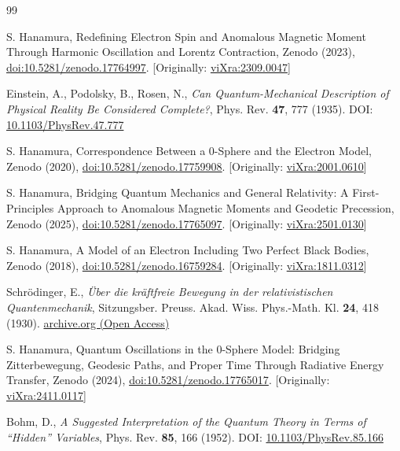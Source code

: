 \documentclass[12pt,letterpaper]{article} %
\begin{document}
\begin{thebibliography}{99}

S. Hanamura, Redefining Electron Spin and Anomalous Magnetic Moment Through Harmonic Oscillation and Lorentz Contraction, Zenodo (2023), \href{https://doi.org/10.5281/zenodo.17764997}{doi:10.5281/zenodo.17764997}. [Originally: \href{https://vixra.org/abs/2309.0047}{viXra:2309.0047}]

Einstein, A., Podolsky, B., Rosen, N., 
\textit{Can Quantum-Mechanical Description of Physical Reality Be Considered Complete?}, 
Phys. Rev. \textbf{47}, 777 (1935). 
DOI: \href{https://doi.org/10.1103/PhysRev.47.777}{10.1103/PhysRev.47.777}

S. Hanamura, Correspondence Between a 0-Sphere and the Electron Model, Zenodo (2020), \href{https://doi.org/10.5281/zenodo.17759908}{doi:10.5281/zenodo.17759908}. [Originally: \href{https://vixra.org/abs/2001.0610}{viXra:2001.0610}]

S. Hanamura, Bridging Quantum Mechanics and General Relativity: A First-Principles Approach to Anomalous Magnetic Moments and Geodetic Precession, Zenodo (2025), \href{https://doi.org/10.5281/zenodo.17765097}{doi:10.5281/zenodo.17765097}. [Originally: \href{https://vixra.org/abs/2501.0130}{viXra:2501.0130}]

S. Hanamura, A Model of an Electron Including Two Perfect Black Bodies, Zenodo (2018), \href{https://doi.org/10.5281/zenodo.16759284}{doi:10.5281/zenodo.16759284}. [Originally: \href{https://vixra.org/abs/1811.0312}{viXra:1811.0312}]

Schr\"{o}dinger, E.,
\textit{Über die kräftfreie Bewegung in der relativistischen Quantenmechanik}, 
Sitzungsber. Preuss. Akad. Wiss. Phys.-Math. Kl. \textbf{24}, 418 (1930). 
\href{https://archive.org/details/uberderkrarelativistischenquantenmechanikschrodinger19300717english}{archive.org (Open Access)}

S. Hanamura, Quantum Oscillations in the 0-Sphere Model: Bridging Zitterbewegung, Geodesic Paths, and Proper Time Through Radiative Energy Transfer, Zenodo (2024), \href{https://doi.org/10.5281/zenodo.17765017}{doi:10.5281/zenodo.17765017}. [Originally: \href{https://vixra.org/abs/2411.0117}{viXra:2411.0117}]

Bohm, D., 
\textit{A Suggested Interpretation of the Quantum Theory in Terms of ``Hidden'' Variables}, 
Phys. Rev. \textbf{85}, 166 (1952). 
DOI: \href{https://doi.org/10.1103/PhysRev.85.166}{10.1103/PhysRev.85.166}


\end{thebibliography}
\end{document}
